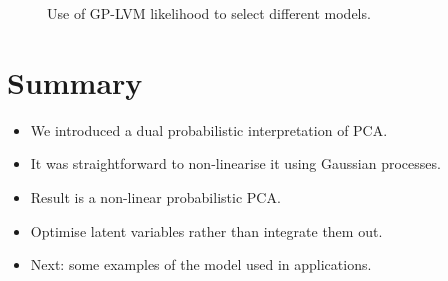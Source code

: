 %
\begin{figure}


\hfill{}


\hfill{}


\hfill{}\caption{Use of GP-LVM likelihood to select different models.}

\end{figure}



\section{Summary}
\begin{itemize}
\item We introduced a dual probabilistic interpretation of PCA.
\item It was straightforward to non-linearise it using Gaussian processes.
\item Result is a non-linear probabilistic PCA.
\item Optimise latent variables rather than integrate them out.
\item Next: some examples of the model used in applications.
\end{itemize}


